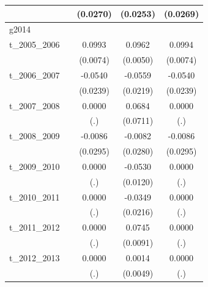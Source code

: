 \begin{table}[htbp]
\begin{tabular}{l*{4}{c}}
            &                     &    (0.0270)         &    (0.0253)         &    (0.0269)         \\
\hline
g2014       &                     &                     &                     &                     \\
t\_2005\_2006 &                     &      0.0993\sym{***}&      0.0962\sym{***}&      0.0994\sym{***}\\
            &                     &    (0.0074)         &    (0.0050)         &    (0.0074)         \\
[1em]
t\_2006\_2007 &                     &     -0.0540\sym{**} &     -0.0559\sym{**} &     -0.0540\sym{**} \\
            &                     &    (0.0239)         &    (0.0219)         &    (0.0239)         \\
[1em]
t\_2007\_2008 &                     &      0.0000         &      0.0684         &      0.0000         \\
            &                     &         (.)         &    (0.0711)         &         (.)         \\
[1em]
t\_2008\_2009 &                     &     -0.0086         &     -0.0082         &     -0.0086         \\
            &                     &    (0.0295)         &    (0.0280)         &    (0.0295)         \\
[1em]
t\_2009\_2010 &                     &      0.0000         &     -0.0530\sym{***}&      0.0000         \\
            &                     &         (.)         &    (0.0120)         &         (.)         \\
[1em]
t\_2010\_2011 &                     &      0.0000         &     -0.0349         &      0.0000         \\
            &                     &         (.)         &    (0.0216)         &         (.)         \\
[1em]
t\_2011\_2012 &                     &      0.0000         &      0.0745\sym{***}&      0.0000         \\
            &                     &         (.)         &    (0.0091)         &         (.)         \\
[1em]
t\_2012\_2013 &                     &      0.0000         &      0.0014         &      0.0000         \\
            &                     &         (.)         &    (0.0049)         &         (.)         \\

\end{tabular}
\end{table}
